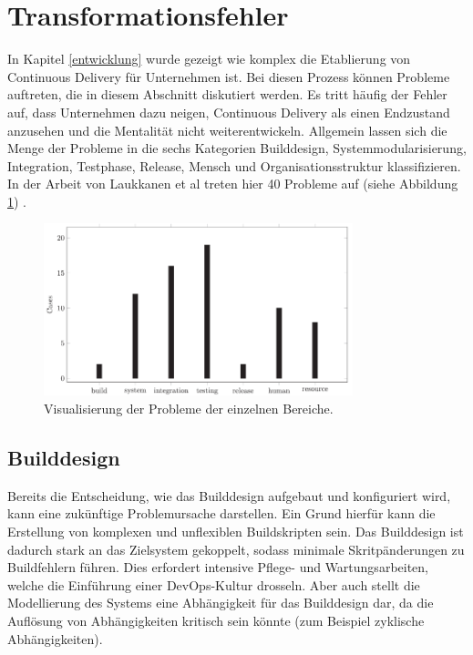 \section{Transformationsfehler} \label{Fehler bei der Transformation}
In Kapitel \ref{entwicklung} wurde gezeigt wie komplex die Etablierung von Continuous Delivery für Unternehmen ist. Bei diesen Prozess können Probleme auftreten, die in diesem Abschnitt diskutiert werden. Es tritt häufig der Fehler auf, dass Unternehmen dazu neigen, Continuous Delivery als einen Endzustand anzusehen und die Mentalität nicht weiterentwickeln. Allgemein lassen sich die Menge der Probleme in die sechs Kategorien Builddesign, Systemmodularisierung, Integration, Testphase, Release, Mensch und Organisationsstruktur klassifizieren. In der Arbeit von Laukkanen et al treten hier 40 Probleme auf (siehe Abbildung \ref{studie}) \cite{Laukkanen.2017}. 

\begin{figure}[ht]
	\centering
	\includegraphics[width=0.8\textwidth,]{images/Transformationproblems}
	\caption{Visualisierung der Probleme der einzelnen Bereiche\cite{Laukkanen.2017}.}
	\label{studie}
\end{figure}

\subsection{Builddesign} \label{builddesgin}
Bereits die Entscheidung, wie das Builddesign aufgebaut und konfiguriert wird, kann eine zukünftige Problemursache darstellen. Ein Grund hierfür kann die Erstellung von komplexen und unflexiblen Buildskripten sein. Das Builddesign ist dadurch stark an das Zielsystem gekoppelt, sodass minimale Skritpänderungen zu Buildfehlern führen. Dies erfordert intensive Pflege- und Wartungsarbeiten, welche die Einführung einer DevOps-Kultur drosseln. Aber auch stellt die Modellierung des Systems eine Abhängigkeit für das Builddesign dar, da die Auflösung von Abhängigkeiten kritisch sein könnte (zum Beispiel zyklische Abhängigkeiten).

